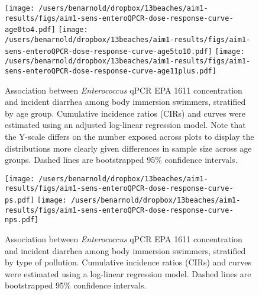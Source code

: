 \documentclass[12pt]{article}\usepackage[]{graphicx}\usepackage[]{color}
\begin{document}
\begin{landscape}
\begin{figure}[h!tb]
\begin{center}
\texttt{[image: /users/benarnold/dropbox/13beaches/aim1-results/figs/aim1-sens-enteroQPCR-dose-response-curve-age0to4.pdf]}
\texttt{[image: /users/benarnold/dropbox/13beaches/aim1-results/figs/aim1-sens-enteroQPCR-dose-response-curve-age5to10.pdf]}
\texttt{[image: /users/benarnold/dropbox/13beaches/aim1-results/figs/aim1-sens-enteroQPCR-dose-response-curve-age11plus.pdf]}
\caption{Association between \emph{Enterococcus} qPCR EPA 1611 concentration and incident diarrhea among body immersion swimmers, stratified by age group. Cumulative incidence ratios (CIRs) and curves were estimated using an adjusted log-linear regression model. Note that the Y-scale differs on the number exposed across plots to display the distributions more clearly given differences in sample size across age groups. Dashed lines are bootstrapped 95\% confidence intervals.  \label{fig:enteroQPCRagecurve}}
\end{center}
\end{figure}
\end{landscape}

\begin{landscape}
\begin{figure}[h!tb]
\begin{center}
\texttt{[image: /users/benarnold/dropbox/13beaches/aim1-results/figs/aim1-sens-enteroQPCR-dose-response-curve-ps.pdf]}
\texttt{[image: /users/benarnold/dropbox/13beaches/aim1-results/figs/aim1-sens-enteroQPCR-dose-response-curve-nps.pdf]}
\caption{Association between \emph{Enterococcus} qPCR EPA 1611 concentration and incident diarrhea among body immersion swimmers, stratified by type of pollution. Cumulative incidence ratios (CIRs) and curves were estimated using a log-linear regression model. Dashed lines are bootstrapped 95\% confidence intervals.  \label{fig:enteroQPCRpscurve}}
\end{center}
\end{figure}
\end{landscape}
\end{document}
